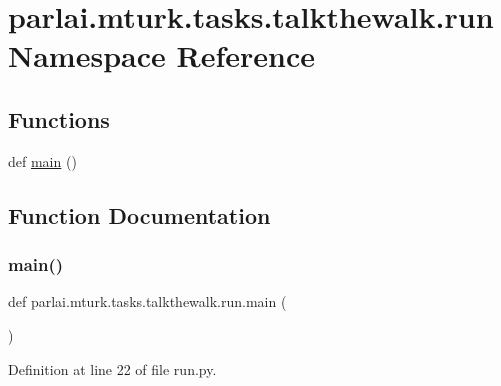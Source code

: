 \hypertarget{namespaceparlai_1_1mturk_1_1tasks_1_1talkthewalk_1_1run}{}\section{parlai.\+mturk.\+tasks.\+talkthewalk.\+run Namespace Reference}
\label{namespaceparlai_1_1mturk_1_1tasks_1_1talkthewalk_1_1run}
\subsection*{Functions}
\begin{DoxyCompactItemize}
\item 
def \hyperlink{namespaceparlai_1_1mturk_1_1tasks_1_1talkthewalk_1_1run_aa3dad7cff29347fafebfb3c91efee8cd}{main} ()
\end{DoxyCompactItemize}


\subsection{Function Documentation}
\mbox{\label{namespaceparlai_1_1mturk_1_1tasks_1_1talkthewalk_1_1run_aa3dad7cff29347fafebfb3c91efee8cd}} 
\subsubsection{\texorpdfstring{main()}{main()}}
{\footnotesize\ttfamily def parlai.\+mturk.\+tasks.\+talkthewalk.\+run.\+main (\begin{DoxyParamCaption}{ }\end{DoxyParamCaption})}



Definition at line 22 of file run.\+py.


